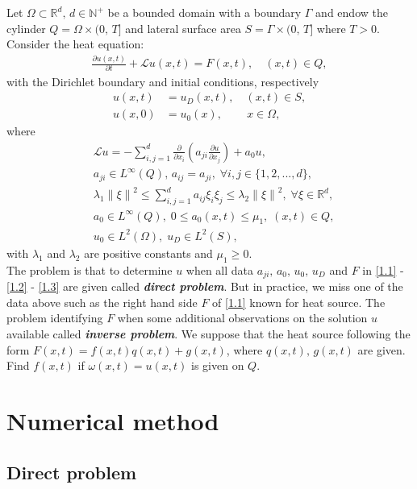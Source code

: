 \documentclass[twocolumn]{article}
\begin{document}
Let $\Omega \subset \mathbb{R}^d,\, d\in \mathbb{N^+}$ be a bounded domain with a boundary $\Gamma$ and endow the cylinder $Q=\Omega\times (0,\, T]$ and lateral surface area $S=\Gamma \times (0,\, T]$ where $T>0$. 
\\
Consider the heat equation:
\begin{align}\label{1.1}
	\frac{\partial u(x, t)}{\partial t}+\mathcal{L}u(x, t)=F(x, t), \quad(x, t)\in Q,
\end{align}
with the Dirichlet boundary and initial conditions, respectively
\begin{align}
	u(x, t)&=u_D(x, t),\quad(x, t)\in S, \label{1.2}\\
	u(x, 0)&=u_0(x),\quad\quad\, x\in \Omega,\label{1.3}
\end{align}
where
\begin{align*}
	&\mathcal{L}u = -\sum_{i, j=1}^{d}\frac{\partial}{\partial x_i}\left(a_{ji}\frac{\partial u}{\partial x_j}\right)+a_0u,\\
	&a_{ji}\in L^{\infty}(Q),\, a_{ij}=a_{ji},\; \forall i, j\in \{1, 2, ..., d\},\\
	&\lambda_1\left\|\xi\right\|^2\leq \sum_{i, j=1}^{d}a_{ij}\xi_i\xi_j\leq \lambda_2\left\|\xi\right\|^2,\; \forall \xi\in\mathbb{R}^d,\\
	&a_0\in L^{\infty}(Q),\; 0\leq a_0(x, t)\leq \mu_1,\; (x, t)\in Q,\\ 
	&u_0\in L^2(\Omega),\;u_D\in L^2(S),
\end{align*}
with $\lambda_1$ and $\lambda_2$ are positive constants and $\mu_1\geq 0$.
\\
The problem is that to determine $u$ when all data $a_{ji},\,a_0,\,u_0,\,u_D$ and $F$ in \eqref{1.1} - \eqref{1.2} - \eqref{1.3} are given called \textbf{\textit{direct problem}}. But in practice, we miss one of the data above such as  the right hand side $F$ of \eqref{1.1} known for heat source. The problem identifying $F$ when some additional observations on the solution $u$ available called \textbf{\textit{inverse problem}}. We suppose that the heat source following the form $F(x, t)=f(x, t)q(x, t)+g(x, t)$, where $q(x, t),\, g(x, t)$ are given. Find $f(x, t)$ if $\omega(x, t)=u(x, t)$ is given on $Q$. 
\section{Numerical method} 
\subsection{Direct problem}
\end{document}
